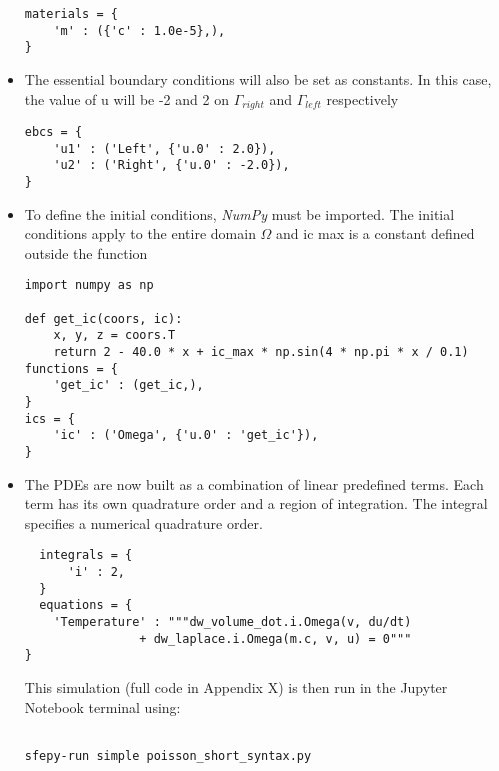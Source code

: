 \documentclass{article}
\begin{document}
\begin{itemize}
\begin{lstlisting}
materials = {
	'm' : ({'c' : 1.0e-5},),
}
\end{lstlisting}

\item The essential boundary conditions will also be set as constants. In this case, the value of u will be -2 and 2 on $\Gamma_{right}$ and $\Gamma_{left}$ respectively

\begin{lstlisting}
ebcs = {
	'u1' : ('Left', {'u.0' : 2.0}),
	'u2' : ('Right', {'u.0' : -2.0}),
}
\end{lstlisting}

\item To define the initial conditions, \emph{NumPy} must be imported. The initial conditions apply to the entire domain $\Omega$ and ic max is a constant defined outside the function

\begin{lstlisting}
import numpy as np

def get_ic(coors, ic):
	x, y, z = coors.T
	return 2 - 40.0 * x + ic_max * np.sin(4 * np.pi * x / 0.1)
functions = {
	'get_ic' : (get_ic,),
}
ics = {
	'ic' : ('Omega', {'u.0' : 'get_ic'}),
}
\end{lstlisting}

\item The PDEs are now built as a combination of linear predefined terms. Each term has its own quadrature order and a region of integration. The integral specifies a numerical quadrature order.

\begin{lstlisting}
  integrals = {
      'i' : 2,
  }
  equations = {
	'Temperature' : """dw_volume_dot.i.Omega(v, du/dt)
				+ dw_laplace.i.Omega(m.c, v, u) = 0"""
}
\end{lstlisting}

This simulation (full code in Appendix X) is then run in the Jupyter Notebook terminal using:

\begin{lstlisting}

sfepy-run simple poisson_short_syntax.py
\end{lstlisting}

\end{itemize}



\end{document}

